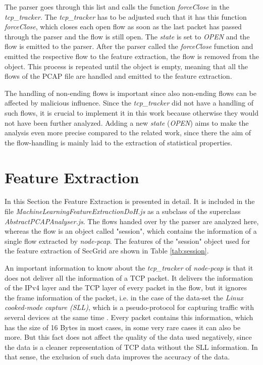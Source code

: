 The parser goes through this list and calls the function \textit{forceClose} in the \textit{tcp\_tracker}. The \textit{tcp\_tracker} has to be adjusted such that it has this function \textit{forceClose}, which closes each open flow as soon as the last packet has passed through the parser and the flow is still open. The \textit{state} is set to \textit{OPEN} and the flow is emitted to the parser. After the parser called the \textit{forceClose} function and emitted the respective flow to the feature extraction, the flow is removed from the object. This process is repeated until the object is empty, meaning that all the flows of the PCAP file are handled and emitted to the feature extraction. 

The handling of non-ending flows is important since also non-ending flows can be affected by malicious influence. Since the \textit{tcp\_tracker} did not have a handling of such flows, it is crucial to implement it in this work because otherwise they would not have been further analyzed. Adding a new \textit{state } (\textit{OPEN}) aims to make the analysis even more precise compared to the related work, since there the aim of the flow-handling is mainly laid to the extraction of statistical properties. 

\section{Feature Extraction} \label{feat_extr_impl}
In this Section the Feature Extraction is presented in detail. It is included in the file \textit{MachineLearningFeatureExtractionDoH.js} as a subclass of the superclass \textit{AbstractPCAPAnalyser.js}. The flows handed over by the parser are analyzed here, whereas the flow is an object called "session", which contains the information of a single flow extracted by \textit{node-pcap}. The features of the "session" object used for the feature extraction of SecGrid are shown in Table \ref{tab:session}.

An important information to know about the \textit{tcp\_tracker} of \textit{node-pcap} is that it does not deliver all the information of a TCP packet. It delivers the information of the IPv4 layer and the TCP layer of every packet in the flow, but it ignores the frame information of the packet, i.e. in the case of the data-set \cite{CIRA-CIC-DoHBrw-2020} the \textit{Linux cooked-mode capture (SLL)}, which is a pseudo-protocol for capturing traffic with several devices at the same time \cite{sll}. Every packet contains this information, which has the size of 16 Bytes in most cases, in some very rare cases it can also be more. But this fact does not affect the quality of the data used negatively, since the data is a cleaner representation of TCP data without the SLL information. In that sense, the exclusion of such data improves the accuracy of the data.

